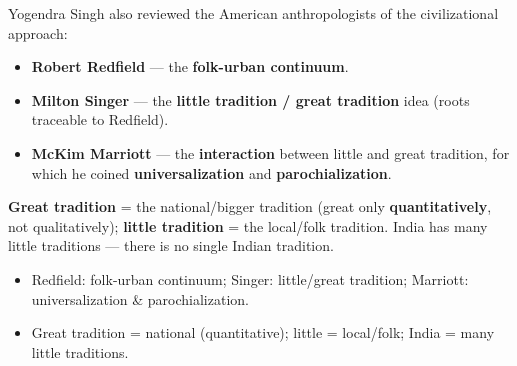 Yogendra Singh also reviewed the American anthropologists of the civilizational approach:
\begin{itemize}
\item \textbf{Robert Redfield} --- the \textbf{folk-urban continuum}.
\item \textbf{Milton Singer} --- the \textbf{little tradition / great tradition} idea (roots traceable to Redfield).
\item \textbf{McKim Marriott} --- the \textbf{interaction} between little and great tradition, for which he coined \textbf{universalization} and \textbf{parochialization}.
\end{itemize}

\begin{KeyConcept}
\textbf{Great tradition} = the national/bigger tradition (great only \textbf{quantitatively}, not qualitatively); \textbf{little tradition} = the local/folk tradition. India has many little traditions --- there is no single Indian tradition.
\end{KeyConcept}

\begin{QuickRevision}
\begin{itemize}
\item Redfield: folk-urban continuum; Singer: little/great tradition; Marriott: universalization \& parochialization.
\item Great tradition = national (quantitative); little = local/folk; India = many little traditions.
\end{itemize}
\end{QuickRevision}
